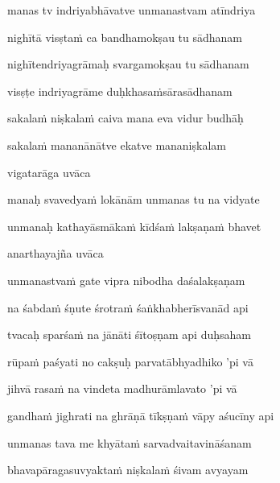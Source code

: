 manas tv indriyabhāvatve unmanastvam atīndriya \veg\dontdisplaylinenum

nighītā visṣta\.m ca bandhamokṣau tu sādhanam\thinspace{\dandab} \dontdisplaylinenum
            \var{\vab \om\ \Ed}%

nighītendriyagrāmaḥ svargamokṣau tu sādhanam \veg\dontdisplaylinenum

visṣṭe indriyagrāme duḥkhasa\.msārasādhanam\thinspace{\dandab} \dontdisplaylinenum

sakala\.m niṣkala\.m caiva mana eva vidur budhāḥ \danda\dontdisplaylinenum

sakala\.m mananānātve ekatve mananiṣkalam \veg\dontdisplaylinenum


vigatarāga uvāca~{\dandab}\dontdisplaylinenum 

manaḥ svavedya\.m lokānām unmanas tu na vidyate\thinspace{\danda} \dontdisplaylinenum

unmanaḥ kathayāsmāka\.m kīdśa\.m lakṣaṇa\.m bhavet \veg\dontdisplaylinenum

anarthayajña uvāca~{\dandab}\dontdisplaylinenum 

unmanastva\.m gate vipra nibodha daśalakṣaṇam\thinspace{\danda} \dontdisplaylinenum

na śabda\.m śṇute śrotra\.m śaṅkhabherīsvanād api \veg\dontdisplaylinenum

tvacaḥ sparśa\.m na jānāti śītoṣṇam api duḥsaham\thinspace{\dandab} \dontdisplaylinenum

rūpa\.m paśyati no cakṣuḥ parvatābhyadhiko 'pi vā \veg\dontdisplaylinenum

jihvā rasa\.m na vindeta madhurāmlavato 'pi vā\thinspace{\dandab} \dontdisplaylinenum

gandha\.m jighrati na ghrāṇā tīkṣṇa\.m vāpy aśucīny api \veg\dontdisplaylinenum

unmanas tava me khyāta\.m sarvadvaitavināśanam\thinspace{\dandab} \dontdisplaylinenum

bhavapāragasuvyakta\.m niṣkala\.m śivam avyayam \veg\dontdisplaylinenum


